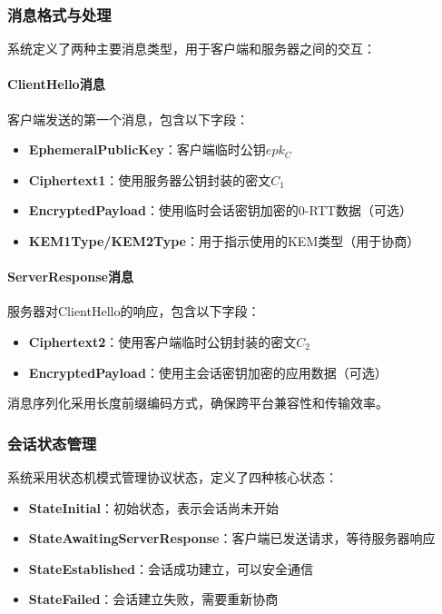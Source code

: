 \subsubsection{消息格式与处理}

系统定义了两种主要消息类型，用于客户端和服务器之间的交互：

\paragraph{ClientHello消息}
客户端发送的第一个消息，包含以下字段：
\begin{itemize}
    \item \textbf{EphemeralPublicKey}：客户端临时公钥$epk_C$
    \item \textbf{Ciphertext1}：使用服务器公钥封装的密文$C_1$
    \item \textbf{EncryptedPayload}：使用临时会话密钥加密的0-RTT数据（可选）
    \item \textbf{KEM1Type/KEM2Type}：用于指示使用的KEM类型（用于协商）
\end{itemize}

\paragraph{ServerResponse消息}
服务器对ClientHello的响应，包含以下字段：
\begin{itemize}
    \item \textbf{Ciphertext2}：使用客户端临时公钥封装的密文$C_2$
    \item \textbf{EncryptedPayload}：使用主会话密钥加密的应用数据（可选）
\end{itemize}

消息序列化采用长度前缀编码方式，确保跨平台兼容性和传输效率。

\subsubsection{会话状态管理}

系统采用状态机模式管理协议状态，定义了四种核心状态：

\begin{itemize}
    \item \textbf{StateInitial}：初始状态，表示会话尚未开始
    \item \textbf{StateAwaitingServerResponse}：客户端已发送请求，等待服务器响应
    \item \textbf{StateEstablished}：会话成功建立，可以安全通信
    \item \textbf{StateFailed}：会话建立失败，需要重新协商
\end{itemize}

